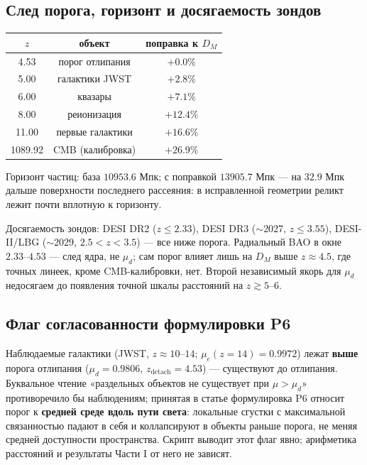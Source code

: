\documentclass{article}
\begin{document}
\subsection{След порога, горизонт и досягаемость зондов}

\begin{center}
\small
\begin{tabular}{@{}ccc@{}}
\toprule
$z$ & объект & поправка к $D_M$ \\
\midrule
4.53 & порог отлипания & $+0.0\%$ \\
5.00 & галактики JWST & $+2.8\%$ \\
6.00 & квазары & $+7.1\%$ \\
8.00 & реионизация & $+12.4\%$ \\
11.00 & первые галактики & $+16.6\%$ \\
1089.92 & CMB (калибровка) & $+26.9\%$ \\
\bottomrule
\end{tabular}
\end{center}

Горизонт частиц: база $10953.6$ Мпк; с поправкой $13905.7$ Мпк --- на $32.9$ Мпк дальше поверхности последнего рассеяния: в исправленной геометрии реликт лежит почти вплотную к горизонту.

Досягаемость зондов: DESI DR2 ($z \le 2.33$), DESI DR3 ($\sim$2027, $z \le 3.55$), DESI-II/LBG ($\sim$2029, $2.5 < z < 3.5$) --- все ниже порога. Радиальный BAO в окне $2.33\text{--}4.53$ --- след ядра, не $\mu_d$; сам порог влияет лишь на $D_M$ выше $z \approx 4.5$, где точных линеек, кроме CMB-калибровки, нет. Второй независимый якорь для $\mu_d$ недосягаем до появления точной шкалы расстояний на $z \gtrsim 5\text{--}6$.

\subsection{Флаг согласованности формулировки P6}

Наблюдаемые галактики (JWST, $z \approx 10\text{--}14$; $\mu_e(z{=}14) = 0.9972$) лежат \textbf{выше} порога отлипания ($\mu_d = 0.9806$, $z_{\text{detach}} = 4.53$) --- существуют до отлипания. Буквальное чтение «раздельных объектов не существует при $\mu > \mu_d$» противоречило бы наблюдениям; принятая в статье формулировка P6 относит порог к \textbf{средней среде вдоль пути света}: локальные сгустки с максимальной связанностью падают в себя и коллапсируют в объекты раньше порога, не меняя средней доступности пространства. Скрипт выводит этот флаг явно; арифметика расстояний и результаты Части I от него не зависят.
\end{document}
